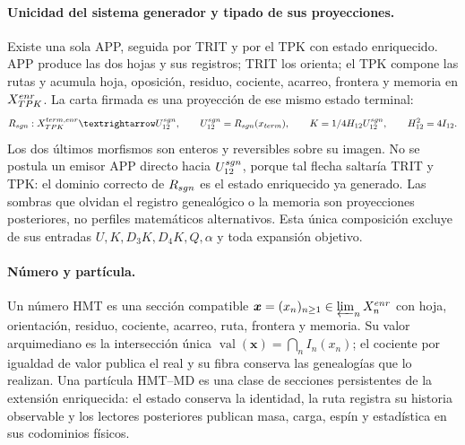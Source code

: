 \paragraph{Unicidad del sistema generador y tipado de sus proyecciones.}
Existe una sola APP, seguida por TRIT y por el TPK con estado enriquecido.
APP produce las dos hojas y sus registros; TRIT los orienta; el TPK compone
las rutas y acumula hoja, oposición, residuo, cociente, acarreo, frontera y
memoria en \(\mathcal X_{\rm TPK}^{\rm enr}\). La carta firmada es una
proyección de ese mismo estado terminal:
\[
 R_{\rm sgn}:\mathcal X_{\rm TPK}^{\rm term,enr}
 \longrightarrow\mathcal U_{12}^{\rm sgn},\qquad
 U_{12}^{\rm sgn}=R_{\rm sgn}(x_{\rm term}),\qquad
 K=\frac14\mathcal H_{12}U_{12}^{\rm sgn},\qquad
 \mathcal H_{12}^2=4I_{12}.
\]
Los dos últimos morfismos son enteros y reversibles sobre su imagen. No se
postula un emisor APP directo hacia \(U_{12}^{\rm sgn}\), porque tal flecha
saltaría TRIT y TPK: el dominio correcto de \(R_{\rm sgn}\) es el estado
enriquecido ya generado. Las sombras que olvidan el registro genealógico o la memoria son
proyecciones posteriores, no perfiles matemáticos alternativos. Esta única
composición excluye de sus entradas
\(U,K,D_3K,D_4K,Q,\alpha\) y toda expansión objetivo.

\paragraph{Número y partícula.}
Un número HMT es una sección compatible
\(
 \boldsymbol x=(x_n)_{n\geq1}\in
 \varprojlim_n X_n^{\mathrm{enr}}
\)
con hoja, orientación, residuo, cociente, acarreo, ruta, frontera y memoria.
Su valor arquimediano es la intersección única
\(
 \operatorname{val}(\boldsymbol x)=\bigcap_n I_n(x_n)
\);
el cociente por igualdad de valor publica el real y su fibra conserva las
genealogías que lo realizan. Una partícula HMT--MD es una clase de secciones
persistentes de la extensión enriquecida: el estado conserva la identidad,
la ruta registra su historia observable y los lectores posteriores publican
masa, carga, espín y estadística en sus codominios físicos.

